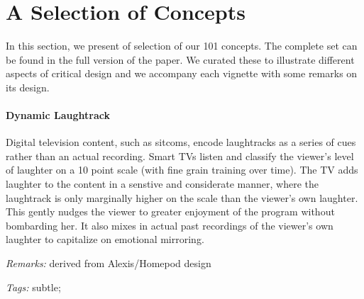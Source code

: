 \section{A Selection of Concepts}

In this section, we present of selection of our 101 concepts. The complete set can be found in the full version of the paper. We curated these to illustrate different aspects of critical design and we accompany each vignette with some remarks on its design.


\paragraph{Dynamic Laughtrack}

Digital television content, such as sitcoms, encode laughtracks as a series of cues rather than an actual recording. Smart TVs listen and classify the viewer's level of laughter on a 10 point scale (with fine grain training over time). The TV adds laughter to the content in a senstive and considerate manner, where the laughtrack is only marginally higher on the scale than the viewer's own laughter. This gently nudges the viewer to greater enjoyment of the program without bombarding her. It also mixes in actual past recordings of the viewer's own laughter to capitalize on emotional mirroring.

\textit{Remarks:} derived from Alexis/Homepod design

\textit{Tags:} subtle;


